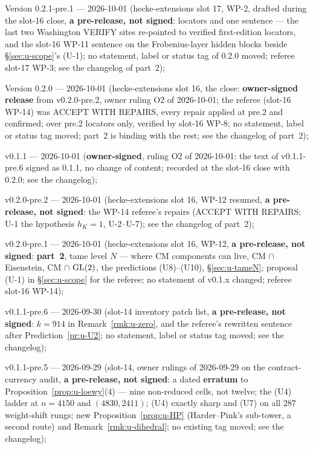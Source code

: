 \documentclass[11pt]{article}
\newcommand{\VERIFYloc}{\textsf{VERIFY}}          %
\begin{document}
Version 0.2.1-pre.1 --- 2026-10-01 (hecke-extensions slot 17, WP-2, drafted during the slot-16 close, \textbf{a pre-release, not signed}: locators
and one \COMP{} sentence --- the last two Washington \VERIFYloc{} sites re-pointed to verified first-edition locators, and the slot-16 WP-11 sentence on the
Frobenius-layer hidden blocks beside \S\ref{sec:u-scope}'s (U-1); no statement, label or status tag of 0.2.0 moved; referee slot-17 WP-3; see the changelog of
part~2);

Version 0.2.0 --- 2026-10-01 (hecke-extensions slot 16, the close: \textbf{owner-signed release} from v0.2.0-pre.2, owner ruling O2 of
2026-10-01; the referee (slot-16 WP-14) was ACCEPT WITH REPAIRS, every repair applied at pre.2 and confirmed; over pre.2 locators only, verified by slot-16
WP-8; no statement, label or status tag moved; part~2 is binding with the rest; see the changelog of part~2);

v0.1.1 --- 2026-10-01 (\textbf{owner-signed}, ruling O2 of 2026-10-01: the text of v0.1.1-pre.6 signed as 0.1.1, no change of content; recorded at the
slot-16 close with 0.2.0; see the changelog);

v0.2.0-pre.2 --- 2026-10-01 (hecke-extensions slot 16, WP-12 resumed, \textbf{a pre-release, not signed}: the WP-14 referee's repairs
(ACCEPT WITH REPAIRS; U-1 the hypothesis $h_K=1$, U-2--U-7); see the changelog of part~2);

v0.2.0-pre.1 --- 2026-10-01 (hecke-extensions slot 16, WP-12, \textbf{a pre-release, not signed}: \textbf{part~2},
tame level $N$ --- where CM components can live, CM $\cap$ Eisenstein, CM $\cap$ $\mathrm{GL}(2)$, the predictions (U8)--(U10), \S\ref{sec:u-tameN}; proposal (U-1)
in \S\ref{sec:u-scope} for the referee; no statement of v0.1.x changed; referee slot-16 WP-14);

v0.1.1-pre.6 --- 2026-09-30 (slot-14 inventory patch list, \textbf{a pre-release, not signed}: $k=914$ in
Remark~\ref{rmk:u-zero}, and the referee's rewritten \COMP{} sentence after Prediction~\ref{pr:u-U2}; no statement, label or status tag moved;
see the changelog);

v0.1.1-pre.5 --- 2026-09-29 (slot-14, owner rulings of 2026-09-29 on the contract-currency audit, \textbf{a pre-release, not
signed}: a dated \textbf{erratum} to Proposition~\ref{prop:u-loewy}(4) --- nine non-reduced cells, not twelve; the (U4) ladder at $n=4150$ and
$(4830,2411)$; (U4) exactly sharp and (U7) on all $287$ weight-shift rungs; new Proposition~\ref{prop:u-HP} (Harder--Pink's sub-tower, a second route)
and Remark~\ref{rmk:u-dihedral}; no existing tag moved; see the changelog);
\end{document}
